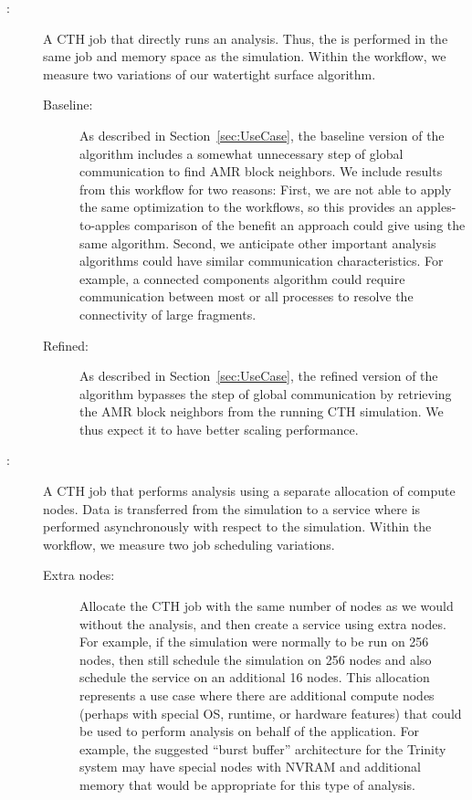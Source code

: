 \begin{description}

\item[\Insitu:] A CTH job that directly runs an \insitu analysis.  Thus,
  the \vda is performed in the same job and memory space as the
  simulation.  Within the \insitu workflow, we measure two variations of
  our watertight surface algorithm.

  \begin{description}

  \item[Baseline:] As described in Section~\ref{sec:UseCase}, the baseline
    version of the algorithm includes a somewhat unnecessary step of global
    communication to find AMR block neighbors.  We include results from
    this workflow for two reasons: First, we are not able to apply the same
    optimization to the \intransit workflows, so this provides an
    apples-to-apples comparison of the benefit an \intransit approach could
    give using the same algorithm.  Second, we anticipate other important
    analysis algorithms could have similar communication characteristics.
    For example, a connected components algorithm could require
    communication between most or all processes to resolve the connectivity
    of large fragments.

  \item[Refined:] As described in Section~\ref{sec:UseCase}, the refined
    version of the algorithm bypasses the step of global communication by
    retrieving the AMR block neighbors from the running CTH simulation.  We
    thus expect it to have better scaling performance.

  \end{description}

\item[\Intransit:] A CTH job that performs \intransit analysis using a
  separate allocation of compute nodes.  Data is transferred from the
  simulation to a service where \vda is performed asynchronously with
  respect to the simulation.  Within the \intransit workflow, we measure
  two job scheduling variations.

  \begin{description}

  \item[Extra nodes:] Allocate the CTH job with the same number of nodes as
    we would without the analysis, and then create a \vda service using
    extra nodes.  For example, if the simulation were normally to be run on
    256 nodes, then still schedule the simulation on 256 nodes and also
    schedule the \vda service on an additional 16 nodes.  This allocation
    represents a use case where there are additional compute nodes (perhaps
    with special OS, runtime, or hardware features) that could be used to
    perform analysis on behalf of the application.  For example, the
    suggested ``burst buffer'' architecture for the Trinity system may have
    special nodes with NVRAM and additional memory that would be
    appropriate for this type of \intransit analysis.


\end{description}
\end{description}
